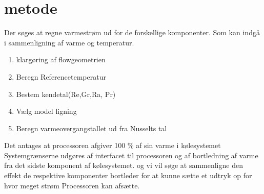 \section{metode}

Der søges at regne varmestrøm ud for de forskellige komponenter. Som kan indgå i sammenligning af varme og temperatur.

\begin{enumerate}
	\item klargøring af flowgeometrien
	\item Beregn Referencetemperatur
	\item Bestem kendetal(Re,Gr,Ra, Pr)
	\item Vælg model ligning
	\item Beregn varmeovergangstallet ud fra Nusselts tal
\end{enumerate}

Det antages at processoren afgiver 100 \% af sin varme i kølesystemet
Systemgrænserne udgøres af interfacet til processoren og af bortledning af varme fra det sidste komponent af kølesystemet.
og vi vil søge at sammenligne den effekt de respektive komponenter bortleder for at kunne sætte et udtryk op for hvor meget strøm Processoren kan afsætte.